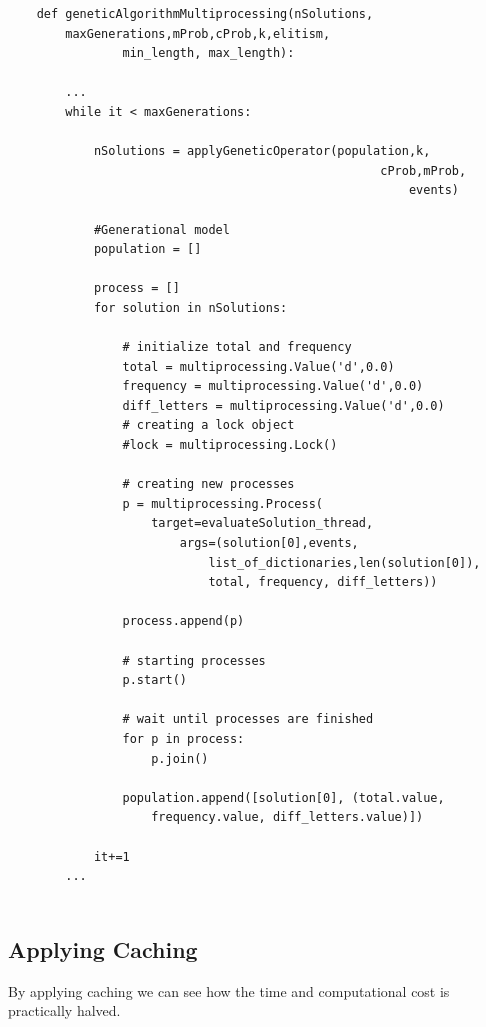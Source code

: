 \documentclass{article}
\begin{document}
    \begin{lstlisting}
    def geneticAlgorithmMultiprocessing(nSolutions,
        maxGenerations,mProb,cProb,k,elitism, 
                min_length, max_length):

        ...
        while it < maxGenerations:

            nSolutions = applyGeneticOperator(population,k,
                                                    cProb,mProb,
                                                        events)

            #Generational model
            population = []

            process = []
            for solution in nSolutions:
            
                # initialize total and frequency
                total = multiprocessing.Value('d',0.0)
                frequency = multiprocessing.Value('d',0.0)
                diff_letters = multiprocessing.Value('d',0.0)
                # creating a lock object
                #lock = multiprocessing.Lock()

                # creating new processes
                p = multiprocessing.Process(
                    target=evaluateSolution_thread,
                        args=(solution[0],events,
                            list_of_dictionaries,len(solution[0]),
                            total, frequency, diff_letters))

                process.append(p)

                # starting processes
                p.start()

                # wait until processes are finished
                for p in process:
                    p.join()

                population.append([solution[0], (total.value, 
                    frequency.value, diff_letters.value)])

            it+=1
        ...
        
    \end{lstlisting}

    \subsection{Applying Caching}

        By applying caching we can see how the time and computational cost is practically halved.
        
\end{document}
